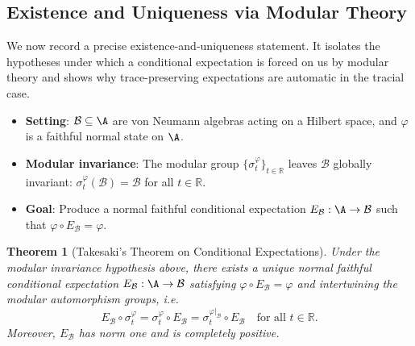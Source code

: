 \documentclass[11pt, a4paper]{article}
\theoremstyle{colored_def}
\theoremstyle{colored_thm}
\newtheorem{theorem}{Theorem}[section]
\theoremstyle{colored_ex}
\newcommand{\R}{\mathbb{R}}
\newcommand{\B}{\mathcal{B}}
\begin{document}
\subsection{Existence and Uniqueness via Modular Theory}\label{subsec:takesaki-expectations}

We now record a precise existence-and-uniqueness statement. It isolates the hypotheses under which a conditional expectation is forced on us by modular theory and shows why trace-preserving expectations are automatic in the tracial case.

\begin{itemize}
    \item \textbf{Setting}: $\B \subseteq \A$ are von Neumann algebras acting on a Hilbert space, and $\varphi$ is a faithful normal state on $\A$.
    \item \textbf{Modular invariance}: The modular group $\{\sigma_t^\varphi\}_{t \in \R}$ leaves $\B$ globally invariant: $\sigma_t^\varphi(\B) = \B$ for all $t \in \R$.
    \item \textbf{Goal}: Produce a normal faithful conditional expectation $E_{\B}: \A \to \B$ such that $\varphi \circ E_{\B} = \varphi$.
\end{itemize}

\begin{theorem}[Takesaki's Theorem on Conditional Expectations]\label{thm:takesaki}
Under the modular invariance hypothesis above, there exists a unique normal faithful conditional expectation $E_{\B}: \A \to \B$ satisfying $\varphi \circ E_{\B} = \varphi$ and intertwining the modular automorphism groups, i.e.
$$
E_{\B} \circ \sigma_t^\varphi = \sigma_t^\varphi \circ E_{\B} = \sigma_t^{\varphi|_{\B}} \circ E_{\B}\quad \text{for all } t \in \R.
$$
Moreover, $E_{\B}$ has norm one and is completely positive. \cite{takesaki1972conditional, sakai1971cstarwstar}
\end{theorem}
\end{document}
